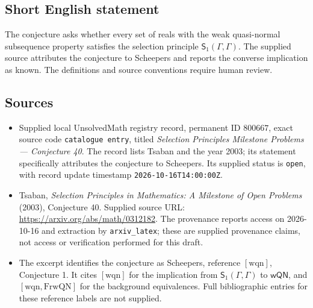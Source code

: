 \documentclass[11pt]{article}
\begin{document}
\subsection{Short English statement}
The conjecture asks whether every set of reals with the weak quasi-normal subsequence property satisfies the selection principle \(\mathsf S_1(\Gamma,\Gamma)\). The supplied source attributes the conjecture to Scheepers and reports the converse implication as known. The definitions and source conventions require human review.
\subsection{Sources}
\begin{itemize}
\item Supplied local UnsolvedMath registry record, permanent ID \(800667\), exact source code \texttt{catalogue entry}, titled \emph{Selection Principles Milestone Problems --- Conjecture 40}. The record lists Tsaban and the year 2003; its statement specifically attributes the conjecture to Scheepers. Its supplied status is \texttt{open}, with record update timestamp \texttt{2026-10-16T14:00:00Z}.
\item Tsaban, \emph{Selection Principles in Mathematics: A Milestone of Open Problems} (2003), Conjecture 40. Supplied source URL: \url{https://arxiv.org/abs/math/0312182}. The provenance reports access on 2026-10-16 and extraction by \texttt{arxiv\_latex}; these are supplied provenance claims, not access or verification performed for this draft.
\item The excerpt identifies the conjecture as Scheepers, reference \([\mathrm{wqn}]\), Conjecture 1. It cites \([\mathrm{wqn}]\) for the implication from \(\mathsf S_1(\Gamma,\Gamma)\) to \(\mathsf{wQN}\), and \([\mathrm{wqn},\mathrm{FrwQN}]\) for the background equivalences. Full bibliographic entries for these reference labels are not supplied.
\end{itemize}
\end{document}
